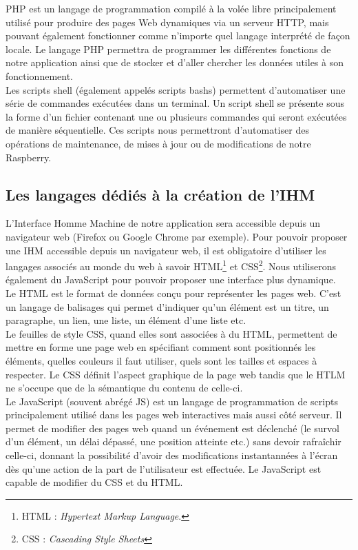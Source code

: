 \documentclass[a4paper, 12pt, french]{article}
\begin{document}
PHP est un langage de programmation compilé à la volée libre principalement utilisé pour produire des pages Web dynamiques via un serveur HTTP, mais pouvant également fonctionner comme n'importe quel langage interprété de façon locale. Le langage PHP permettra de programmer les différentes fonctions de notre application ainsi que de stocker et d'aller chercher les données utiles à son fonctionnement.\\

Les scripts shell (également appelés scripts bashs) permettent d'automatiser une série de commandes exécutées dans un terminal. Un script shell se présente sous la forme d'un fichier contenant une ou plusieurs commandes qui seront exécutées de manière séquentielle. Ces scripts nous permettront d'automatiser des opérations de maintenance, de mises à jour ou de modifications de notre Raspberry.

\subsection{Les langages dédiés à la création de l'IHM}
L'Interface Homme Machine de notre application sera accessible depuis un navigateur web (Firefox ou Google Chrome par exemple). Pour pouvoir proposer une IHM accessible depuis un navigateur web, il est obligatoire d'utiliser les langages associés au monde du web à savoir HTML\footnote{HTML : \textit{Hypertext Markup Language}.} et CSS\footnote{CSS : \textit{Cascading Style Sheets}}. Nous utiliserons également du JavaScript pour pouvoir proposer une interface plus dynamique.\\

Le HTML est le format de données conçu pour représenter les pages web. C'est un langage de balisages qui permet d'indiquer qu'un élément est un titre, un paragraphe, un lien, une liste, un élément d'une liste etc.\\

Le feuilles de style CSS, quand elles sont associées à du HTML, permettent de mettre en forme une page web en spécifiant comment sont positionnés les éléments, quelles couleurs il faut utiliser, quels sont les tailles et espaces à respecter. Le CSS définit l'aspect graphique de la page web tandis que le HTLM ne s'occupe que de la sémantique du contenu de celle-ci.\\

Le JavaScript (souvent abrégé JS) est un langage de programmation de scripts principalement utilisé dans les pages web interactives mais aussi côté serveur. Il permet de modifier des pages web quand un événement est déclenché (le survol d'un élément, un délai dépassé, une position atteinte etc.) sans devoir rafraîchir celle-ci, donnant la possibilité d'avoir des modifications instantannées à l'écran dès qu'une action de la part de l'utilisateur est effectuée. Le JavaScript est capable de modifier du CSS et du HTML.
\end{document}
